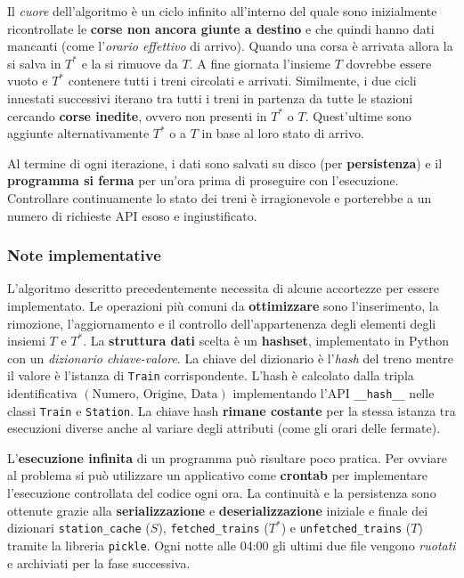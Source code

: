 \documentclass[12pt,italian]{report}
\begin{document}
Il \textit{cuore} dell'algoritmo è un ciclo infinito all'interno del
quale sono inizialmente ricontrollate le \textbf{corse non ancora
    giunte a destino} e che quindi hanno dati mancanti (come
l'\textit{orario effettivo} di arrivo).  Quando una corsa è arrivata
allora la si salva in $T^*$ e la si rimuove da $T$.  A fine giornata
l'insieme $T$ dovrebbe essere vuoto e $T^*$ contenere tutti i treni
circolati e arrivati.  Similmente, i due cicli innestati successivi
iterano tra tutti i treni in partenza da tutte le stazioni cercando
\textbf{corse inedite}, ovvero non presenti in $T^*$ o $T$.
Quest'ultime sono aggiunte alternativamente $T^*$ o a $T$ in base al
loro stato di arrivo.

Al termine di ogni iterazione, i dati sono salvati su disco (per
\textbf{persistenza}) e il \textbf{programma si ferma} per un'ora
prima di proseguire con l'esecuzione.  Controllare continuamente lo
stato dei treni è irragionevole e porterebbe a un numero di richieste
API esoso e ingiustificato.

\subsubsection{Note implementative}

L'algoritmo descritto precedentemente necessita di alcune accortezze
per essere implementato.  Le operazioni più comuni da
\textbf{ottimizzare} sono l'inserimento, la rimozione, l'aggiornamento
e il controllo dell'appartenenza degli elementi degli insiemi $T$ e
$T^*$.  La \textbf{struttura dati} scelta è un \textbf{hashset},
implementato in Python con un \textit{dizionario chiave-valore}.  La
chiave del dizionario è l'\textit{hash} del treno mentre il valore è
l'istanza di \texttt{Train} corrispondente.  L'hash è calcolato dalla
tripla identificativa
$(\textrm{Numero}, \, \textrm{Origine}, \, \textrm{Data})$
implementando l'API \texttt{\_\_hash\_\_} nelle classi \texttt{Train}
e \texttt{Station}.  La chiave hash \textbf{rimane costante} per la
stessa istanza tra esecuzioni diverse anche al variare degli attributi
(come gli orari delle fermate).

L'\textbf{esecuzione infinita} di un programma può risultare poco
pratica.  Per ovviare al problema si può utilizzare un applicativo
come \textbf{crontab} per implementare l'esecuzione controllata del
codice ogni ora.  La continuità e la persistenza sono ottenute grazie
alla \textbf{serializzazione} e \textbf{deserializzazione} iniziale e
finale dei dizionari \texttt{station\_cache} ($S$),
\texttt{fetched\_trains} ($T^*$) e \texttt{unfetched\_trains} ($T$)
tramite la libreria \texttt{pickle}.  Ogni notte alle 04:00 gli ultimi
due file vengono \textit{ruotati} e archiviati per la fase
successiva.
\end{document}
